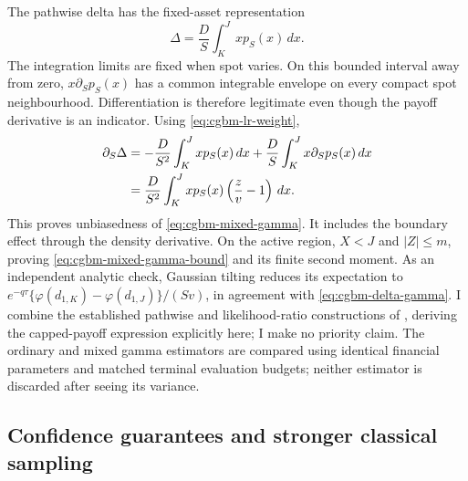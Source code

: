 \documentclass[11pt]{article}
\begin{document}
The pathwise delta has the fixed-asset representation
\begin{equation}
 \Delta=\frac{D}{S}\int_K^J x p_S(x)\,dx.
 \label{eq:cgbm-delta-density}
\end{equation}
The integration limits are fixed when spot varies. On this bounded
interval away from zero, $x\partial_S p_S(x)$ has a common integrable
envelope on every compact spot neighbourhood. Differentiation is
therefore legitimate even though the payoff derivative is an indicator.
Using \eqref{eq:cgbm-lr-weight},
\begin{align}
 \partial_S\Delta
 &=-\frac{D}{S^2}\int_K^J x p_S(x)\,dx
 +\frac{D}{S}\int_K^J x\partial_Sp_S(x)\,dx\notag\\
 &=\frac{D}{S^2}\int_K^J x p_S(x)
 \left(\frac{z}{v}-1\right)\,dx.
 \label{eq:cgbm-mixed-gamma-derivation}
\end{align}
This proves unbiasedness of \eqref{eq:cgbm-mixed-gamma}. It includes the
boundary effect through the density derivative. On the active region,
$X<J$ and $|Z|\leq m$, proving \eqref{eq:cgbm-mixed-gamma-bound} and its
finite second moment. As an independent analytic check, Gaussian tilting
reduces its expectation to
$e^{-q\tau}\{\varphi(d_{1,K})-\varphi(d_{1,J})\}/(Sv)$,
in agreement with \eqref{eq:cgbm-delta-gamma}. I combine the established
pathwise and likelihood-ratio constructions of
\citet{broadieglasserman1996}, deriving the capped-payoff expression
explicitly here; I make no priority claim. The ordinary and mixed gamma
estimators are compared using identical financial parameters and matched
terminal evaluation budgets; neither estimator is discarded after
seeing its variance.

\subsection{Confidence guarantees and stronger classical sampling}
\end{document}

